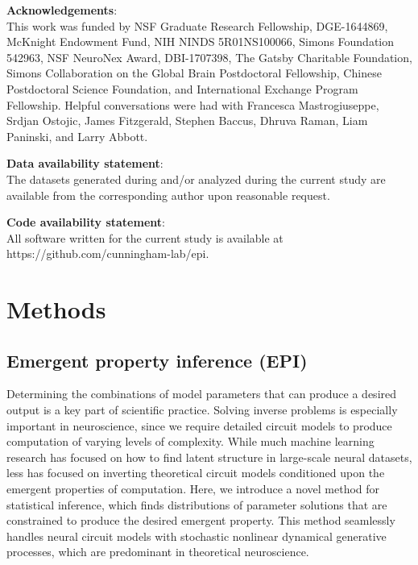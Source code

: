 \documentclass[11pt]{article}
\begin{document}
\textbf{Acknowledgements}: \\
This work was funded by NSF Graduate Research Fellowship,  DGE-1644869, McKnight Endowment Fund, NIH NINDS 5R01NS100066, Simons Foundation 542963, NSF NeuroNex Award, DBI-1707398, The Gatsby Charitable Foundation, Simons Collaboration on the Global Brain Postdoctoral Fellowship, Chinese Postdoctoral Science Foundation, and International Exchange Program Fellowship. 
Helpful conversations were had with Francesca Mastrogiuseppe, Srdjan Ostojic, James Fitzgerald, Stephen Baccus, Dhruva Raman, Liam Paninski, and Larry Abbott.

\textbf{Data availability statement}: \\
The datasets generated during and/or analyzed during the current study are available from the corresponding author upon reasonable request.

\textbf{Code availability statement}: \\
All software written for the current study is available at https://github.com/cunningham-lab/epi.




\newpage 

\section{Methods}

\subsection{Emergent property inference (EPI)}\label{methods_EPI}
Determining the combinations of model parameters that can produce a desired output is a key part of scientific practice.
Solving inverse problems is especially important in neuroscience, since we require detailed circuit models to produce computation of varying levels of complexity.
While much machine learning research has focused on how to find latent structure in large-scale neural datasets, less has focused on inverting theoretical circuit models conditioned upon the emergent properties of computation.
Here, we introduce a novel method for statistical inference, which finds distributions of parameter solutions that are constrained to produce the desired emergent property.
This method seamlessly handles neural circuit models with stochastic nonlinear dynamical generative processes, which are predominant in theoretical neuroscience.
 
\end{document}
